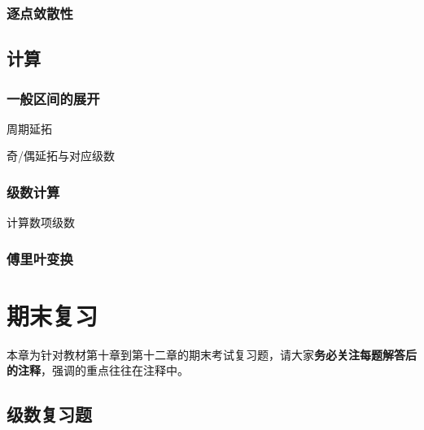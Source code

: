 \documentclass[a4paper,UTF8,fontset=windows,AutoFakeBold]{ctexart}
\theoremstyle{ex}
\begin{document}
\subsubsection{逐点敛散性}

\subsection{计算}
\subsubsection{一般区间的展开}
周期延拓

奇/偶延拓与对应级数

\subsubsection{级数计算}
计算数项级数

\subsubsection{傅里叶变换}

\newpage
\section{期末复习}
本章为针对教材第十章到第十二章的期末考试复习题，请大家\textbf{务必关注每题解答后的注释}，强调的重点往往在注释中。

\subsection{级数复习题}
\end{document}
